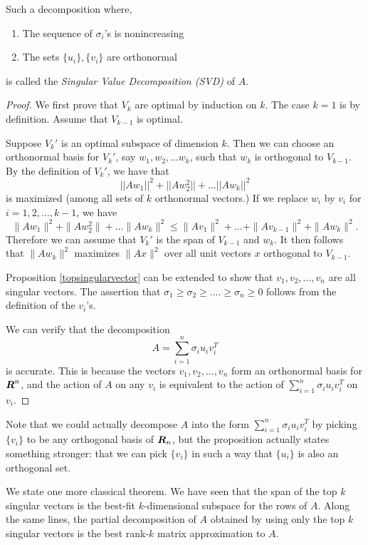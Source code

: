 \documentclass{book}
\numberwithin{exercise}{chapter}
\begin{document}
Such a decomposition where,
\begin{enumerate}
\item The sequence of $\sigma_i$'s is nonincreasing
\item The sets $\{u_i\},\{v_i\}$ are orthonormal
\end{enumerate}
is called the \emph{Singular Value Decomposition (SVD)} of $A$.

\begin{proof}
We first prove that $V_k$ are optimal by induction on $k$. The case $k=1$ is by definition. Assume that $V_{k-1}$ is optimal.

Suppose $V_k'$ is an optimal subspace of dimension $k$. Then we can
choose an orthonormal basis for $V_k'$, say  $w_1,w_2,\ldots w_k$, such
that $w_k$ is orthogonal to $V_{k-1}$. By the definition of
$V_k'$, we have that
$$||Aw_1||^2+||Aw_2^2||+\ldots ||Aw_k||^2$$
is maximized (among all sets of $k$ orthonormal vectors.) If
we replace $w_i$ by $v_i$ for $i=1,2,\ldots,k-1$, we have
\[
\|Aw_1\|^2+\|Aw_2^2\|+\ldots \|Aw_k\|^2 \le \|Av_1\|^2+\ldots+\|Av_{k-1}\|^2 + \|Aw_k\|^2.
 \]
Therefore we can assume that $V_k'$ is the span of $V_{k-1}$ and $w_k$. It then follows that $\|Aw_k\|^2$ maximizes $\|Ax\|^2$ over all unit vectors $x$ orthogonal to $V_{k-1}$.

Proposition \ref{topsingularvector}
can be extended to show that $v_1,v_2,...,v_n$
are all singular vectors.  The assertion that $\sigma_1 \ge \sigma_2
\ge .... \ge \sigma_n \ge 0$ follows from the definition of the
$v_i$'s.

We can verify that the decomposition
\[
A = \sum_{i=1}^n\sigma_i u_i v_i^T
\]
is accurate.  This is because the
vectors $v_1,v_2,...,v_n$ form an orthonormal basis for $\mbox{\mbox{\boldmath $R$}}^n$, and
the action of $A$ on any $v_i$ is equivalent to the action of
$\sum_{i=1}^n \sigma_i u_i v_i^T$ on $v_i$.
\end{proof}

Note that we could
actually decompose $A$ into the form $\sum_{i=1}^n \sigma_i u_i
v_i^T$ by picking $\{v_i\}$ to be any orthogonal basis of $\mbox{\mbox{\boldmath $R$}}_n$, but
the proposition actually states something stronger: that we can pick
$\{v_i\}$ in such a way that $\{u_i\}$ is also an orthogonal set.

We state one more classical theorem.  We have seen that the span of the top
$k$ singular vectors is the best-fit $k$-dimensional subspace for
the rows of $A$.  Along the same lines, the partial
decomposition of $A$ obtained by using only the top $k$ singular
vectors is the best rank-$k$ matrix approximation to $A$.
\end{document}

